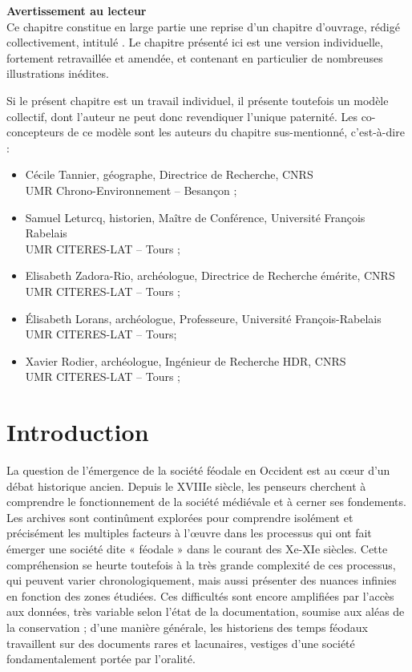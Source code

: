 \begin{mdframed}[backgroundcolor=gray!10,footnoteinside=false]
{\blueroman
	\textbf{Avertissement au lecteur}\\

Ce chapitre constitue en large partie une reprise d'un chapitre d'ouvrage, rédigé collectivement, intitulé  \autocite{cura_transition_2017}.
Le chapitre présenté ici est une version individuelle, fortement retravaillée et amendée, et contenant en particulier de nombreuses illustrations inédites.

Si le présent chapitre est un travail individuel, il présente toutefois un modèle collectif, dont l'auteur ne peut donc revendiquer l'unique paternité.
Les co-concepteurs de ce modèle sont les auteurs du chapitre sus-mentionné, c'est-à-dire :
\begin{itemize}
	\item Cécile Tannier, géographe, Directrice de Recherche, CNRS
	\\UMR Chrono-Environnement -- Besançon ;
	\item Samuel Leturcq, historien, Maître de Conférence, Université François Rabelais
	\\UMR CITERES-LAT -- Tours ; 
	\item Elisabeth Zadora-Rio, archéologue, Directrice de Recherche émérite, CNRS
	\\UMR CITERES-LAT -- Tours ;
	\item Élisabeth Lorans, archéologue, Professeure, Université François-Rabelais \\
	UMR CITERES-LAT -- Tours;
	\item Xavier Rodier, archéologue, Ingénieur de Recherche HDR, CNRS 
	\\UMR CITERES-LAT -- Tours ;
\end{itemize}
}
\end{mdframed}

\section{Introduction}

La question de l'émergence de la société féodale en Occident est au cœur d'un débat historique ancien.
Depuis le XVIIIe siècle, les penseurs cherchent à comprendre le fonctionnement de la société médiévale et à cerner ses fondements.
Les archives sont continûment explorées pour comprendre isolément et précisément les multiples facteurs à l'œuvre dans les processus qui ont fait émerger une société dite « féodale » dans le courant des Xe-XIe siècles.
Cette compréhension se heurte toutefois à la très grande complexité de ces processus, qui peuvent varier chronologiquement, mais aussi présenter des nuances infinies en fonction des zones étudiées.
Ces difficultés sont encore amplifiées par l'accès aux données, très variable selon l'état de la documentation, soumise aux aléas de la conservation ; d'une manière générale, les historiens des temps féodaux travaillent sur des documents rares et lacunaires, vestiges d'une société fondamentalement portée par l'oralité.


